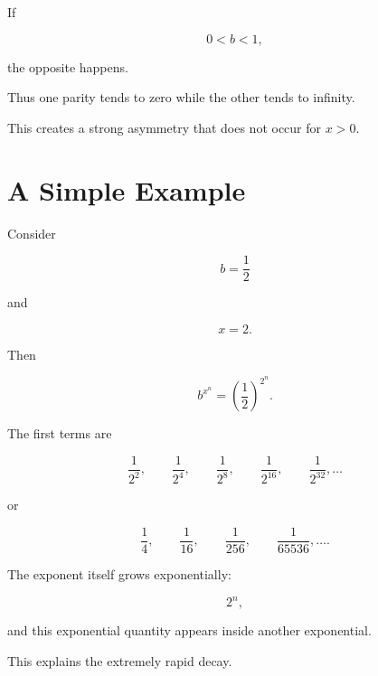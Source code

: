 If

\[
0<b<1,
\]

the opposite happens.

Thus one parity tends to zero while the other tends to infinity.

This creates a strong asymmetry that does not occur for \(x>0\).

\section{A Simple Example}

Consider

\[
b=\frac12
\]

and

\[
x=2.
\]

Then

\[
b^{x^n}
=
\left(\frac12\right)^{2^n}.
\]

The first terms are

\[
\frac{1}{2^2},
\qquad
\frac{1}{2^4},
\qquad
\frac{1}{2^8},
\qquad
\frac{1}{2^{16}},
\qquad
\frac{1}{2^{32}},
\ldots
\]

or

\[
\frac14,
\qquad
\frac1{16},
\qquad
\frac1{256},
\qquad
\frac1{65536},
\ldots.
\]

The exponent itself grows exponentially:

\[
2^n,
\]

and this exponential quantity appears inside another exponential.

This explains the extremely rapid decay.

